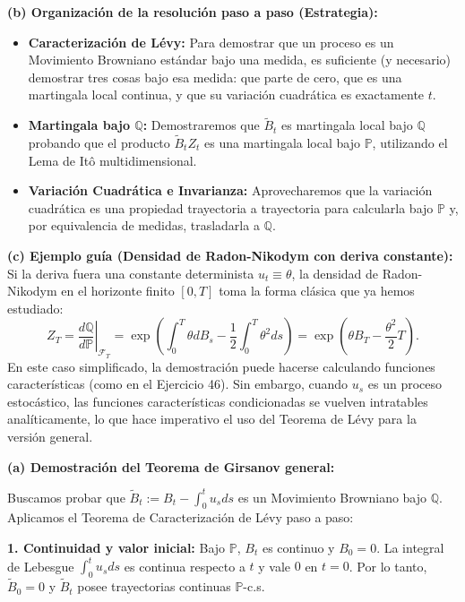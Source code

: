 \documentclass[11pt, letterpaper]{article}
\begin{document}
\begin{solucion}
    \textbf{(b) Organización de la resolución paso a paso (Estrategia):}
    \begin{itemize}
        \item[(i)] \textbf{Caracterización de Lévy:} Para demostrar que un proceso es un Movimiento Browniano estándar bajo una medida, es suficiente (y necesario) demostrar tres cosas bajo esa medida: que parte de cero, que es una martingala local continua, y que su variación cuadrática es exactamente $t$.
        \item[(ii)] \textbf{Martingala bajo $\mathbb{Q}$:} Demostraremos que $\tilde{B}_t$ es martingala local bajo $\mathbb{Q}$ probando que el producto $\tilde{B}_t Z_t$ es una martingala local bajo $\mathbb{P}$, utilizando el Lema de Itô multidimensional.
        \item[(iii)] \textbf{Variación Cuadrática e Invarianza:} Aprovecharemos que la variación cuadrática es una propiedad trayectoria a trayectoria para calcularla bajo $\mathbb{P}$ y, por equivalencia de medidas, trasladarla a $\mathbb{Q}$.
    \end{itemize}

    \vspace{3mm}
    \textbf{(c) Ejemplo guía (Densidad de Radon-Nikodym con deriva constante):}
    Si la deriva fuera una constante determinista $u_t \equiv \theta$, la densidad de Radon-Nikodym en el horizonte finito $[0, T]$ toma la forma clásica que ya hemos estudiado:
    \[ Z_T = \left.\frac{d\mathbb{Q}}{d\mathbb{P}}\right|_{\mathcal{F}_T} = \exp\left( \int_0^T \theta dB_s - \frac{1}{2} \int_0^T \theta^2 ds \right) = \exp\left( \theta B_T - \frac{\theta^2}{2} T \right). \]
    En este caso simplificado, la demostración puede hacerse calculando funciones características (como en el Ejercicio 46). Sin embargo, cuando $u_s$ es un proceso estocástico, las funciones características condicionadas se vuelven intratables analíticamente, lo que hace imperativo el uso del Teorema de Lévy para la versión general.

    \vspace{3mm}
    \textbf{(a) Demostración del Teorema de Girsanov general:}

    Buscamos probar que $\tilde{B}_t := B_t - \int_0^t u_s ds$ es un Movimiento Browniano bajo $\mathbb{Q}$. Aplicamos el Teorema de Caracterización de Lévy paso a paso:

    \textbf{1. Continuidad y valor inicial:}
    Bajo $\mathbb{P}$, $B_t$ es continuo y $B_0 = 0$. La integral de Lebesgue $\int_0^t u_s ds$ es continua respecto a $t$ y vale $0$ en $t=0$. Por lo tanto, $\tilde{B}_0 = 0$ y $\tilde{B}_t$ posee trayectorias continuas $\mathbb{P}$-c.s.


\end{solucion}
\end{document}

